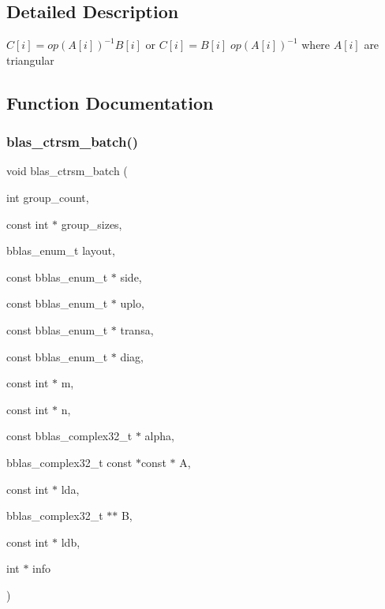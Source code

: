 \subsection{Detailed Description}
$ C[i] = op(A[i])^{-1} B[i] $ or $ C[i] = B[i] \;op(A[i])^{-1} $ where $ A[i] $ are triangular 



\subsection{Function Documentation}
\mbox{\label{group__trsm__batch_ga99df0f7380cf330eebe672bf5c73beab}} 
\subsubsection{\texorpdfstring{blas\+\_\+ctrsm\+\_\+batch()}{blas\_ctrsm\_batch()}}
{\footnotesize\ttfamily void blas\+\_\+ctrsm\+\_\+batch (\begin{DoxyParamCaption}\item[{int}]{group\+\_\+count,  }\item[{const int $\ast$}]{group\+\_\+sizes,  }\item[{bblas\+\_\+enum\+\_\+t}]{layout,  }\item[{const bblas\+\_\+enum\+\_\+t $\ast$}]{side,  }\item[{const bblas\+\_\+enum\+\_\+t $\ast$}]{uplo,  }\item[{const bblas\+\_\+enum\+\_\+t $\ast$}]{transa,  }\item[{const bblas\+\_\+enum\+\_\+t $\ast$}]{diag,  }\item[{const int $\ast$}]{m,  }\item[{const int $\ast$}]{n,  }\item[{const bblas\+\_\+complex32\+\_\+t $\ast$}]{alpha,  }\item[{bblas\+\_\+complex32\+\_\+t const $\ast$const $\ast$}]{A,  }\item[{const int $\ast$}]{lda,  }\item[{bblas\+\_\+complex32\+\_\+t $\ast$$\ast$}]{B,  }\item[{const int $\ast$}]{ldb,  }\item[{int $\ast$}]{info }\end{DoxyParamCaption})}

